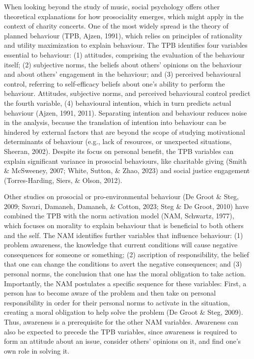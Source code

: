 \documentclass[
  man,floatsintext]{apa6}
\begin{document}
When looking beyond the study of music, social psychology offers other theoretical explanations for how prosociality emerges, which might apply in the context of charity concerts. One of the most widely spread is the theory of planned behaviour (TPB, Ajzen, 1991), which relies on principles of rationality and utility maximization to explain behaviour. The TPB identifies four variables essential to behaviour: (1) attitudes, comprising the evaluation of the behaviour itself; (2) subjective norms, the beliefs about others' opinions on the behaviour and about others' engagement in the behaviour; and (3) perceived behavioural control, referring to self-efficacy beliefs about one's ability to perform the behaviour. Attitudes, subjective norms, and perceived behavioural control predict the fourth variable, (4) behavioural intention, which in turn predicts actual behaviour (Ajzen, 1991, 2011). Separating intention and behaviour reduces noise in the analysis, because the translation of intention into behaviour can be hindered by external factors that are beyond the scope of studying motivational determinants of behaviour (e.g., lack of resources, or unexpected situations, Sheeran, 2002). Despite its focus on personal benefit, the TPB variables can explain significant variance in prosocial behaviours, like charitable giving (Smith \& McSweeney, 2007; White, Sutton, \& Zhao, 2023) and social justice engagement (Torres-Harding, Siers, \& Olson, 2012).

Other studies on prosocial or pro-environmental behaviour (De Groot \& Steg, 2009; Savari, Damaneh, Damaneh, \& Cotton, 2023; Steg \& De Groot, 2010) have combined the TPB with the norm activation model (NAM, Schwartz, 1977), which focuses on morality to explain behaviour that is beneficial to both others and the self. The NAM identifies further variables that influence behaviour: (1) problem awareness, the knowledge that current conditions will cause negative consequences for someone or something; (2) ascription of responsibility, the belief that one can change the conditions to avert the negative consequences; and (3) personal norms, the conclusion that one has the moral obligation to take action. Importantly, the NAM postulates a specific sequence for these variables: First, a person has to become aware of the problem and then take on personal responsibility in order for their personal norms to activate in the situation, creating a moral obligation to help solve the problem (De Groot \& Steg, 2009). Thus, awareness is a prerequisite for the other NAM variables. Awareness can also be expected to precede the TPB variables, since awareness is required to form an attitude about an issue, consider others' opinions on it, and find one's own role in solving it.
\end{document}
